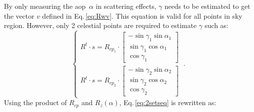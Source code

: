 By only measuring the \gls{aop}~$\alpha$ in scattering effects, $\gamma$ needs
to be estimated to get the vector $v$ defined in Eq.\,\eqref{eq:Rwv}. This
equation is valid for all points in sky region. However, only 2 celestial
points are required to estimate $\gamma$ such as:
\begin{equation}
\begin{cases}
R^{t}\cdot s=R_{cp_{1}}\cdot\left[\begin{array}{c}
-\sin\gamma_{1}\sin\alpha_{1}\\
\sin\gamma_{1}\cos\alpha_{1}\\
\cos\gamma_{1}
\end{array}\right]\\
R^{t}\cdot s=R_{cp_{2}}\cdot\left[\begin{array}{c}
-\sin\gamma_{2}\sin\alpha_{2}\\
\sin\gamma_{2}\cos\alpha_{2}\\
\cos\gamma_{2}
\end{array}\right]
\end{cases} \ .
\label{eq:2setseq}
\end{equation}
Using the product of $R_{cp}$ and $R_z(\alpha)$, Eq.\,\eqref{eq:2setseq}
is rewritten as:

